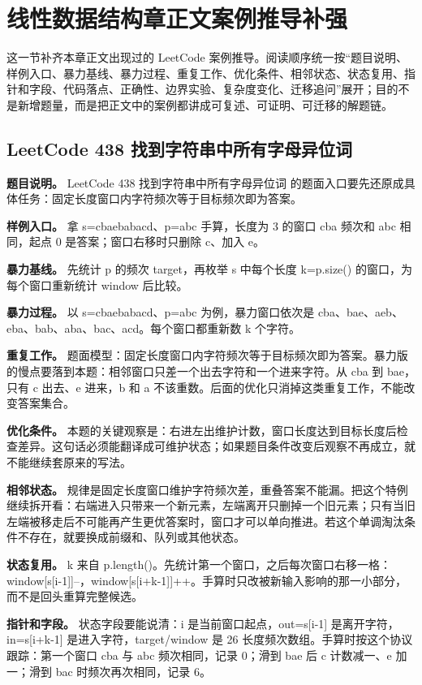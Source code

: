 \section{线性数据结构章正文案例推导补强}

这一节补齐本章正文出现过的 LeetCode 案例推导。阅读顺序统一按“题目说明、样例入口、暴力基线、暴力过程、重复工作、优化条件、相邻状态、状态复用、指针和字段、代码落点、正确性、边界实验、复杂度变化、迁移追问”展开；目的不是新增题量，而是把正文中的案例都讲成可复述、可证明、可迁移的解题链。

\subsection{LeetCode 438 找到字符串中所有字母异位词}

\textbf{题目说明。} LeetCode 438 找到字符串中所有字母异位词 的题面入口要先还原成具体任务：固定长度窗口内字符频次等于目标频次即为答案。

\textbf{样例入口。} 拿 s=cbaebabacd、p=abc 手算，长度为 3 的窗口 cba 频次和 abc 相同，起点 0 是答案；窗口右移时只删除 c、加入 e。

\textbf{暴力基线。} 先统计 p 的频次 target，再枚举 s 中每个长度 k=p.size() 的窗口，为每个窗口重新统计 window 后比较。

\textbf{暴力过程。} 以 s=cbaebabacd、p=abc 为例，暴力窗口依次是 cba、bae、aeb、eba、bab、aba、bac、acd。每个窗口都重新数 k 个字符。

\textbf{重复工作。} 题面模型：固定长度窗口内字符频次等于目标频次即为答案。暴力版的慢点要落到本题：相邻窗口只差一个出去字符和一个进来字符。从 cba 到 bae，只有 c 出去、e 进来，b 和 a 不该重数。后面的优化只消掉这类重复工作，不能改变答案集合。

\textbf{优化条件。} 本题的关键观察是：右进左出维护计数，窗口长度达到目标长度后检查差异。这句话必须能翻译成可维护状态；如果题目条件改变后观察不再成立，就不能继续套原来的写法。

\textbf{相邻状态。} 规律是固定长度窗口维护字符频次差，重叠答案不能漏。把这个特例继续拆开看：右端进入只带来一个新元素，左端离开只删掉一个旧元素；只有当旧左端被移走后不可能再产生更优答案时，窗口才可以单向推进。若这个单调淘汰条件不存在，就要换成前缀和、队列或其他状态。

\textbf{状态复用。} k 来自 p.length()。先统计第一个窗口，之后每次窗口右移一格：window[s[i-1]]--，window[s[i+k-1]]++。手算时只改被新输入影响的那一小部分，而不是回头重算完整候选。

\textbf{指针和字段。} 状态字段要能说清：i 是当前窗口起点，out=s[i-1] 是离开字符，in=s[i+k-1] 是进入字符，target/window 是 26 长度频次数组。手算时按这个协议跟踪：第一个窗口 cba 与 abc 频次相同，记录 0；滑到 bae 后 c 计数减一、e 加一；滑到 bac 时频次再次相同，记录 6。

